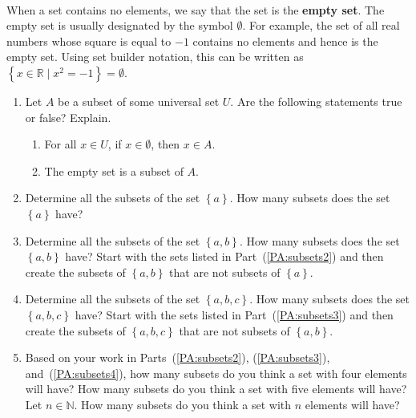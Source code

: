 \hbreak
%
\begin{previewactivity} \label{PA:subsets} \hfill \\
When a set contains no elements, we say that the set is the \textbf{empty set}.
%
%
The empty set is usually designated by the symbol  $\emptyset $.  For example, the set of all real numbers whose square is equal to $-1$ contains no elements and hence is the empty set.  Using set builder notation, this can be written as 
$\left\{ {x \in \mathbb{R} \mid x^2 = -1} \right\} = \emptyset $.

\begin{enumerate}
\item Let  $A$  be a subset of some universal set  $U$\!.  \label{PA:subsets1}
Are the following statements true or false?  Explain.

  \begin{enumerate}
    \item For all $x \in U$, if  $x \in \emptyset $, then  $x \in A$.
    \item The empty set is a subset of $A$.
  \end{enumerate}

\item Determine all the subsets of the set  $\left\{ a \right\}$. How many subsets does the set  $\left\{ a \right\}$ have?  \label{PA:subsets2}

\item Determine all the subsets of the set  $\left\{ {a, b} \right\}$.  How many subsets does the set  $\left\{ {a, b} \right\}$ have?  \hint  Start with the sets listed in Part~(\ref{PA:subsets2}) and then create the subsets of   $\left\{ {a, b} \right\}$  that are not subsets of   $\left\{ a \right\}$.  \label{PA:subsets3}

\item Determine all the subsets of the set  $\left\{ {a, b, c} \right\}$.  How many subsets does the set  $\left\{ {a, b, c} \right\}$  have?  \hint  Start with the sets listed in Part~(\ref{PA:subsets3}) and then create the subsets of   $\left\{ {a, b, c} \right\}$  that are not subsets of   $\left\{ {a, b} \right\}$.  \label{PA:subsets4}

\item Based on your work in Parts~(\ref{PA:subsets2}), (\ref{PA:subsets3}), and~(\ref{PA:subsets4}), how many subsets do you think a set with  four  elements will have? How many subsets do you think a set with  five  elements will have?  Let  $n \in \mathbb{N}$.  How many subsets do you think a set with  $n$  elements will have?

\end{enumerate}
\end{previewactivity}
